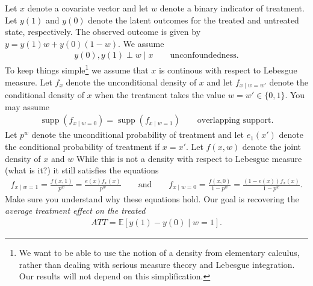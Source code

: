 \documentclass[a4paper]{scrartcl}
\newcommand{\E}{\mathbb{E}}
\DeclareMathOperator{\supp}{supp}
\begin{document}
Let $x$ denote a covariate vector and let $w$ denote a binary indicator of treatment. 
Let $y(1)$ and $y(0)$ denote the latent outcomes for the treated and untreated state, respectively. 
The observed outcome is given by $y = y(1)w + y(0)(1 - w)$.
We assume 
\begin{align*}
	y(0), y(1) \perp w \mid x \qquad \text{unconfoundedness}.
\end{align*}
To keep things simple\footnote{We want to be able to use the notion of a density from elementary calculus, rather than dealing with serious measure theory and Lebesgue integration. Our results will not depend on this simplification.} we assume that $x$ is continous with respect to Lebesgue measure. Let $f_x$ denote the unconditional density of $x$ and let $f_{x \mid w = w'}$ denote the conditional density of $x$ when the treatment takes the value $w = w' \in \{0,1\}$. 
You may assume 
\begin{align*}
	\supp(f_{x \mid w = 0}) = \supp(f_{x \mid w = 1}) \qquad \text{overlapping support.}
\end{align*}
Let $p^w$ denote the unconditional probability of treatment and let $e_1(x')$ denote the conditional probability of treatment if $x = x'$.
Let $f(x, w)$ denote the joint density of $x$ and $w$ While this is not a density with respect to Lebesgue measure (what is it?) it still satisfies the equations 
\begin{align*}
	f_{x \mid w = 1} = \frac{f(x, 1)}{p^w} = \frac{e(x) f_x(x)}{p^w}
	\qquad \text{and} \qquad 
	f_{x \mid w = 0} = \frac{f(x, 0)}{1 - p^w} = \frac{(1 - e(x)) f_x(x)}{1 - p^w}. 
\end{align*}
Make sure you understand why these equations hold. Our goal is recovering the \emph{average treatment effect on the treated}
\begin{align*}
	ATT = \E \left[y(1) - y(0) \mid w = 1\right].
\end{align*}
\end{document}
